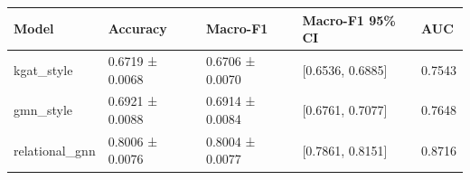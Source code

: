 \begin{tabular}{lllll}
\toprule
Model & Accuracy & Macro-F1 & Macro-F1 95\% CI & AUC \\
\midrule
kgat\_style & 0.6719 ± 0.0068 & 0.6706 ± 0.0070 & [0.6536, 0.6885] & 0.7543 \\
gmn\_style & 0.6921 ± 0.0088 & 0.6914 ± 0.0084 & [0.6761, 0.7077] & 0.7648 \\
relational\_gnn & 0.8006 ± 0.0076 & 0.8004 ± 0.0077 & [0.7861, 0.8151] & 0.8716 \\
\bottomrule
\end{tabular}
